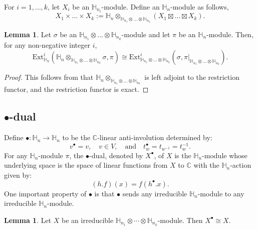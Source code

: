 \documentclass[11pt]{amsart}
\numberwithin{equation}{section}
\theoremstyle{definition}
\newtheorem{lemma}[thm]{Lemma}
\begin{document}
For $i=1, \ldots, k$, let $X_i$ be an $\mathbb H_{n_i}$-module. Define an \(\mathbb H_n\)-module as follows,
\begin{equation} \label{eqn parabolic induction}
X_1\times \ldots \times X_k := \mathbb H_{n} \otimes_{\mathbb H_{n_1}\otimes \ldots \otimes \mathbb H_{n_k}}(X_1\boxtimes \ldots \boxtimes X_k) .
\end{equation}


\begin{lemma} \label{lem frobenius}
Let $\sigma$ be an $\mathbb H_{n_1}\otimes \ldots \otimes \mathbb H_{n_k}$-module and let $\pi$ be an $\mathbb H_n$-module. Then, for any non-negative integer $i$,
\[  \mathrm{Ext}^i_{\mathbb H_n}(\mathbb H_n\otimes_{\mathbb H_{n_1}\otimes \ldots \otimes \mathbb H_{n_k}}\sigma, \pi ) \cong \mathrm{Ext}^i_{\mathbb H_{n_1}\otimes \ldots \otimes \mathbb H_{n_k}}(\sigma, \pi|_{\mathbb H_{n_1}\otimes \ldots \otimes \mathbb H_{n_k}}) .
\]
\end{lemma}

\begin{proof}
This follows from that $\mathbb H_n\otimes_{\mathbb H_{n_1}\otimes\ldots \otimes \mathbb H_{n_k}}$ is left adjoint to the restriction functor, and the restriction functor is exact.
\end{proof}



\subsection{$\bullet$-dual}

Define $\bullet: \mathbb H_n \rightarrow \mathbb H_n$ to be the \(\mathbb C\)-linear anti-involution determined by:
\[   v^{\bullet} = v , \quad v \in V, \quad \mbox{and} \quad  t_w^{\bullet} =t_{w^{-1}}=t_w^{-1} . \]
For any $\mathbb H_n$-module $\pi$, the $\bullet$-dual, denoted by $X^{\bullet}$, of $X$ is the $\mathbb H_n$-module whose underlying space is the space of linear functions from $X$ to $\mathbb C$ with the $\mathbb H_n$-action given by:
\[  (h.f)(x)=f(h^{\bullet}.x) .\]
One important property of $\bullet$ is that $\bullet$ sends any irreducible $\mathbb H_n$-module to any irreducible $\mathbb H_n$-module.

\begin{lemma} \label{lem irr bullet self dual}
Let \(X\) be an irreducible \(\mathbb H_{n_1}\otimes \cdots \otimes \mathbb H_{n_k}\)-module. Then \(X^{\bullet} \cong X\).
\end{lemma}
\end{document}
